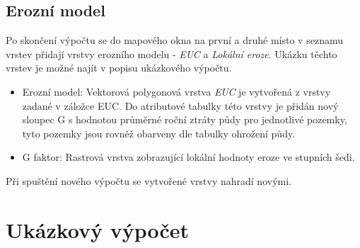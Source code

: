 \subsection{Erozní model} Po skončení výpočtu se do mapového okna na
první a druhé místo v seznamu vrstev přidají vrstvy erozního modelu -
\textit{EUC} a \textit{Lokální eroze}. Ukázku těchto vrstev je možné
najít v popisu ukázkového výpočtu.
\begin{itemize}
	\item Erozní model: Vektorová polygonová vrstva \textit{EUC}
je vytvořená z vrstvy zadané v záložce EUC. Do atributové tabulky této
vrstvy je přidán nový sloupec G s hodnotou průměrné roční ztráty půdy
pro jednotlivé pozemky, tyto pozemky jsou rovněž obarveny dle tabulky
ohrožení půdy.
	\item G faktor: Rastrová vrstva zobrazující lokální hodnoty
eroze ve stupních šedi.
\end{itemize} Při spuštění nového výpočtu se vytvořené vrstvy nahradí
novými.

\section{Ukázkový výpočet}

